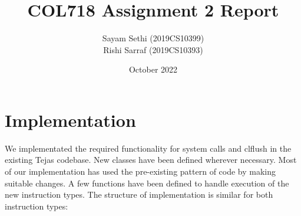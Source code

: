 \documentclass[11pt]{article}
\title{COL718 Assignment 2 Report}
\author{Sayam Sethi (2019CS10399)\\Rishi Sarraf (2019CS10393)}
\date{October 2022}
\begin{document}
\maketitle

\tableofcontents


\section{Implementation}
We implementated the required functionality for system calls and clflush in the existing Tejas codebase. New classes have been defined wherever necessary. Most of our implementation has used the pre-existing pattern of code by making suitable changes. A few functions have been defined to handle execution of the new instruction types. The structure of implementation is similar for both instruction types:
\end{document}
